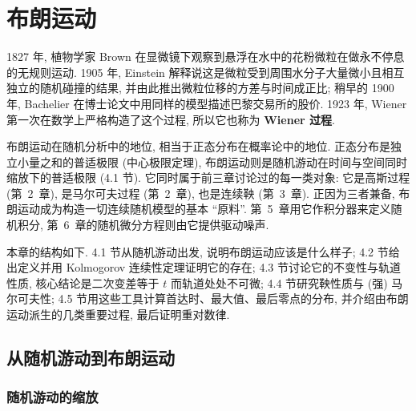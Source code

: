 \chapter{布朗运动}
\label{ch:4}

1827 年, 植物学家 Brown 在显微镜下观察到悬浮在水中的花粉微粒在做永不停息的无规则运动. 1905 年, Einstein 解释说这是微粒受到周围水分子大量微小且相互独立的随机碰撞的结果, 并由此推出微粒位移的方差与时间成正比; 稍早的 1900 年, Bachelier 在博士论文中用同样的模型描述巴黎交易所的股价. 1923 年, Wiener 第一次在数学上严格构造了这个过程, 所以它也称为 \textbf{Wiener 过程}.

布朗运动在随机分析中的地位, 相当于正态分布在概率论中的地位. 正态分布是独立小量之和的普适极限 (中心极限定理), 布朗运动则是随机游动在时间与空间同时缩放下的普适极限 (4.1 节). 它同时属于前三章讨论过的每一类对象: 它是高斯过程 (第~2~章), 是马尔可夫过程 (第~2~章), 也是连续鞅 (第~3~章). 正因为三者兼备, 布朗运动成为构造一切连续随机模型的基本 ``原料''. 第~5~章用它作积分器来定义随机积分, 第~6~章的随机微分方程则由它提供驱动噪声.

本章的结构如下. 4.1 节从随机游动出发, 说明布朗运动应该是什么样子; 4.2 节给出定义并用 Kolmogorov 连续性定理证明它的存在; 4.3 节讨论它的不变性与轨道性质, 核心结论是二次变差等于 $t$ 而轨道处处不可微; 4.4 节研究鞅性质与 (强) 马尔可夫性; 4.5 节用这些工具计算首达时、最大值、最后零点的分布, 并介绍由布朗运动派生的几类重要过程, 最后证明重对数律.

\section{从随机游动到布朗运动}
\label{sec:4-1}

\subsection{随机游动的缩放}

